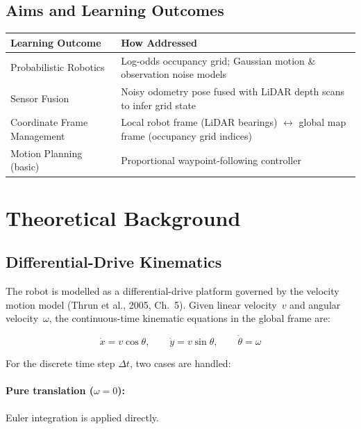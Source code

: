 \documentclass[12pt,a4paper]{article}
\begin{document}
\subsection{Aims and Learning Outcomes}

\begin{table}[H]
\centering
\begin{tabular}{@{}p{4.5cm}p{9cm}@{}}
\toprule
\textbf{Learning Outcome} & \textbf{How Addressed} \\
\midrule
Probabilistic Robotics & Log-odds occupancy grid; Gaussian motion \& observation noise models \\
Sensor Fusion & Noisy odometry pose fused with LiDAR depth scans to infer grid state \\
Coordinate Frame Management & Local robot frame (LiDAR bearings) $\leftrightarrow$ global map frame (occupancy grid indices) \\
Motion Planning (basic) & Proportional waypoint-following controller \\
\bottomrule
\end{tabular}
\end{table}

\section{Theoretical Background}

\subsection{Differential-Drive Kinematics}

The robot is modelled as a differential-drive platform governed by the velocity motion model (Thrun et al., 2005, Ch.~5). Given linear velocity~\(v\) and angular velocity~\(\omega\), the continuous-time kinematic equations in the global frame are:

\begin{equation}
    \dot{x} = v \cos\theta, \qquad \dot{y} = v \sin\theta, \qquad \dot{\theta} = \omega
\end{equation}

For the discrete time step \(\Delta t\), two cases are handled:

\paragraph{Pure translation (\(\omega = 0\)):} Euler integration is applied directly.
\end{document}
